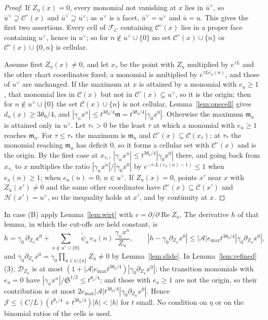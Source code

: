 \begin{proof}
If $Z_{\bar u}(x)=0$, every monomial not vanishing at $x$ lies in $\bar u^\vee$, so $\bar u^\vee\supseteq\mathcal C^\circ(x)$
and $\bar u^\vee\supseteq u^\vee$; as $u^\vee$ is a facet, $\bar u^\vee=u^\vee$ and $\bar u=u$. This gives the first two
assertions. Every cell of $\mathcal F_C$ containing $\mathcal C^\circ(x)$ lies in a proper face containing $u^\vee$, hence in
$u^\vee$; so for $n\notin u^\vee\cup\{0\}$ no set $\mathcal C^\circ(x)\cup\{n\}$ or $\mathcal C^\circ(x)\cup\{0,n\}$ is
cellular.

Assume first $Z_u(x)\ne0$, and let $x_\tau$ be the point with $Z_u$ multiplied by $e^{\tau L}$ and the other chart
coordinates fixed; a monomial is multiplied by $e^{\tau Le_u(n)}$, and those of $u^\vee$ are unchanged. If the maximum at
$x$ is attained by a monomial with $e_u\ge1$, that monomial lies in $\mathcal C(x)$ but not in $\mathcal C^\circ(x)\subseteq
u^\vee$, so it is the origin; then for $n\notin u^\vee\cup\{0\}$ the set $\mathcal C(x)\cup\{n\}$ is not cellular,
Lemma~\ref{lem:onecell} gives $d_n(x)\ge3\theta_0/4$, and $|\gamma_nx^n|\le t^{3\theta_0/4}\mathfrak m=t^{3\theta_0/4}
|\gamma_0x^0|$. Otherwise the maximum $\mathfrak m_u$ is attained only in $u^\vee$. Let $\tau_*>0$ be the least $\tau$ at
which a monomial with $e_u\ge1$ reaches $\mathfrak m_u$. For $\tau\le\tau_*$ the maximum is $\mathfrak m_u$ and
$\mathcal C^\circ(x)\subseteq\mathcal C(x_\tau)$; at $\tau_*$ the monomial reaching $\mathfrak m_u$ has deficit $0$, so it forms
a cellular set with $\mathcal C^\circ(x)$ and is the origin. By the first case at $x_{\tau_*}$,
$|\gamma_nx^n|\le t^{3\theta_0/4}|\gamma_0x^0|$ there, and going back from $x_{\tau_*}$ to $x$ multiplies the ratio
$|\gamma_nx^n|/|\gamma_0x^0|$ by $e^{-\tau_*L(e_u(n)-1)}\le1$ when $e_u(n)\ge1$; when $e_u(n)=0$, $n\in u^\vee$. If
$Z_u(x)=0$, points $x'$ near $x$ with $Z_u(x')\ne0$ and the same other coordinates have
$\mathcal C^\circ(x)\subseteq\mathcal C(x')$ and $\mathcal H(x')=u^\vee$, so the inequality holds at $x'$, and by continuity at
$x$.
\end{proof}

In case (B) apply Lemma~\ref{lem:wirt} with $v=\partial/\partial\operatorname{Re}Z_u$. The derivative $h$ of that lemma, in
which the cut-offs are held constant, is
\[
h=\gamma_0\,\partial_{Z_u}x^0+\sum_{n\notin u^\vee\cup\{0\}}\tilde\psi_n\,e_u(n)\,\frac{\gamma_nx^n}{Z_u},\qquad
|h-\gamma_0\partial_{Z_u}x^0|\le|\mathcal A|e_{\max}t^{3\theta_0/4}|\gamma_0\partial_{Z_u}x^0|,
\]
and $\gamma_0\partial_{Z_u}x^0=\gamma_0\prod_{\bar u\in\mathsf c\setminus\{u\}}Z_{\bar u}\ne0$ by Lemma~\ref{lem:slide}. In
Lemma~\ref{lem:refined}(3), $\mathcal D_{Z_u}$ is at most $(1+|\mathcal A|e_{\max}t^{3\theta_0/4})|\gamma_0\partial_{Z_u}x^0|$; the
transition monomials with $e_u=0$ have $|\gamma_nx^n|/\mathfrak S^{1/2}\le t^{\theta_1/4}$; and those with $e_u\ge1$ are not
the origin, so their contribution is at most $2e_{\max}|\mathcal A|t^{3\theta_0/4}|\gamma_0\partial_{Z_u}x^0|$. Hence
$\mathcal J\le(C/L)(t^{\theta_1/4}+t^{3\theta_0/4})|h|<|h|$ for $t$ small. No condition on $\eta$ or on the binomial ratios
of the cells is used.

